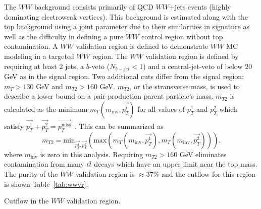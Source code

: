 The $WW$ background consists primarily of QCD $WW$+jets events (highly dominating electroweak vertices). This background is estimated along with the top background using a joint parameter due to their similarities in signature as well as the difficulty in defining a pure $WW$ control region without top contamination. A $WW$ validation region is defined to demonstrate $WW$ MC modeling in a targeted $WW$ region.  The $WW$ validation region is defined by requiring at least 2 jets, a $b$-veto ($N_{b-jet}<1$) and a central-jet-veto of below $20$ GeV as in the signal region. Two additional cuts differ from the signal region: $m_T>130$ GeV and $m_{T2}>160$ GeV. $m_{T2}$, or the stransverse mass, is used to describe a lower bound on a pair-production parent particle's mass. $m_{T2}$ is calculated as the minimum $m_T(m_{\text{inv}},\vec{p_T^i})$ for all values of $p_T^1$ and $p_T^2$ which satisfy $\vec{p_T^1}+\vec{p_T^2}=\vec{p_T^{\text{miss}}}$~\cite{MT2}. This can be summarized as
\begin{equation}
m_{T2}=\text{min}_{\vec{p_T^1},\vec{p_T^2}}(\text{max}(m_T(m_{\text{inv}},\vec{p_T^1}),m_T(m_{\text{inv}},\vec{p_T^2}))).
\end{equation}
where $m_{\text{inv}}$ is zero in this analysis. Requiring $m_{T2}>160$ GeV eliminates contamination from many $t\bar{t}$ decays which have an upper limit near the top mass. The purity of the $WW$ validation region is $\approx 37\%$ and the cutflow for this region is shown Table~\ref{tab:wwvr}.

\begin{table}[h!]
\centering
\scalebox{0.63}{

}
\caption{Cutflow in the $WW$ validation region.}
\label{tab:wwvr}
\end{table}

